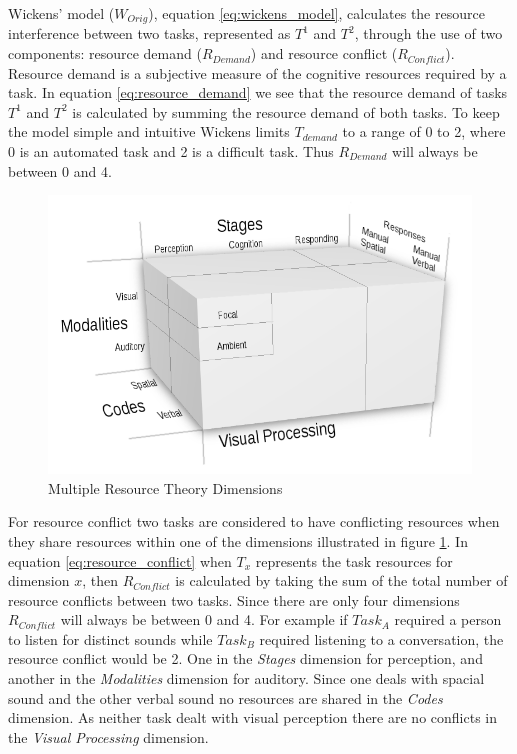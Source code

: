 Wickens' model ($W_{Orig}$), equation \ref{eq:wickens_model}, calculates the resource interference between two tasks, represented as $T^{1}$ and $T^{2}$, through the use of two components: resource demand ($R_{Demand}$) and resource conflict ($R_{Conflict}$).  Resource demand is a subjective measure of the cognitive resources required by a task.  In equation \ref{eq:resource_demand} we see that the resource demand of tasks $T^{1}$ and $T^{2}$ is calculated by summing the resource demand of both tasks.  To keep the model simple and intuitive Wickens limits $T_{demand}$ to a range of 0 to 2, where 0 is an automated task and 2 is a difficult task.  Thus $R_{Demand}$ will always be between 0 and 4.


\begin{figure}[h]
\begin{center}
\includegraphics[width=6in]{multipleresourcetheory.png}
\caption{Multiple Resource Theory Dimensions~\cite{wickens2002multiple}}
\label{fig:multipleresourcetheory}
\end{center}
\end{figure}

For resource conflict two tasks are considered to have conflicting resources when they share resources within one of the dimensions illustrated in figure \ref{fig:multipleresourcetheory}.  In equation \ref{eq:resource_conflict} when $T_{x}$ represents the task resources for dimension $x$, then $R_{Conflict}$ is calculated by taking the sum of the total number of resource conflicts between two tasks.  Since there are only four dimensions $R_{Conflict}$ will always be between 0 and 4.  For example if $Task_{A}$ required a person to listen for distinct sounds while $Task_{B}$ required listening to a conversation, the resource conflict would be 2.  One in the {\em Stages} dimension for perception, and another in the {\em Modalities} dimension for auditory.  Since one deals with spacial sound and the other verbal sound no resources are shared in the {\em Codes} dimension.  As neither task dealt with visual perception there are no conflicts in the {\em Visual Processing} dimension.


